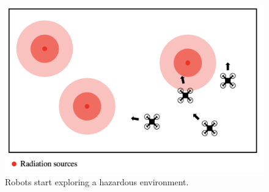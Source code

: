 
\begin{figure}
     \includegraphics[width=16cm]{figures/dora_explorer/risk_aware_a.png}
     \caption[Risk-awareness intuition (1)]{Robots start exploring a hazardous environment.}
     \label{risk_aware_a}
\end{figure}


